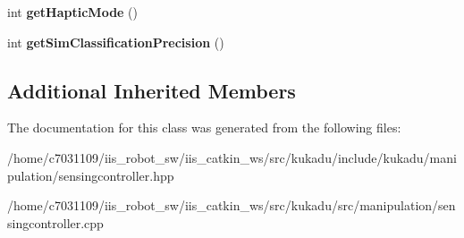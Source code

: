 \begin{DoxyCompactItemize}
\item 
\hypertarget{classkukadu_1_1SensingController_a351901d07d4a17d855a4c63b24788af6}{int {\bfseries get\-Haptic\-Mode} ()}\label{classkukadu_1_1SensingController_a351901d07d4a17d855a4c63b24788af6}

\item 
\hypertarget{classkukadu_1_1SensingController_acd94396772ba64fbfd14d7fcc3c581e9}{int {\bfseries get\-Sim\-Classification\-Precision} ()}\label{classkukadu_1_1SensingController_acd94396772ba64fbfd14d7fcc3c581e9}

\end{DoxyCompactItemize}
\subsection*{Additional Inherited Members}


The documentation for this class was generated from the following files\-:\begin{DoxyCompactItemize}
\item 
/home/c7031109/iis\-\_\-robot\-\_\-sw/iis\-\_\-catkin\-\_\-ws/src/kukadu/include/kukadu/manipulation/sensingcontroller.\-hpp\item 
/home/c7031109/iis\-\_\-robot\-\_\-sw/iis\-\_\-catkin\-\_\-ws/src/kukadu/src/manipulation/sensingcontroller.\-cpp\end{DoxyCompactItemize}

